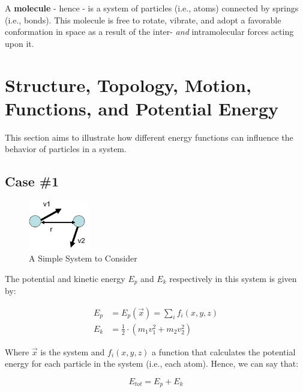 \documentclass[
  letterpaper,
  DIV=11,
  numbers=noendperiod]{scrreprt}
\begin{document}
A \textbf{molecule} - hence - is a system of particles (i.e., atoms)
connected by springs (i.e., bonds). This molecule is free to rotate,
vibrate, and adopt a favorable conformation in space as a result of the
inter- \emph{and} intramolecular forces acting upon it.

\hypertarget{structure-topology-motion-functions-and-potential-energy-1}{%
\section{Structure, Topology, Motion, Functions, and Potential
Energy}\label{structure-topology-motion-functions-and-potential-energy-1}}

This section aims to illustrate how different energy functions can
influence the behavior of particles in a system.

\hypertarget{case-1-1}{%
\subsection{Case \#1}\label{case-1-1}}

\begin{figure}

{\centering \includegraphics[width=1.04in,height=\textheight]{./images/wk1/system.jpg}

}

\caption{A Simple System to Consider}

\end{figure}

The potential and kinetic energy \(E_p\) and \(E_k\) respectively in
this system is given by:

\begin{align}
  E_p &= E_p(\vec{x}) = \sum_{i}f_i(x, y, z) \\ 
  E_k &= \frac{1}{2} \cdot (m_1v_1^2 + m_2v_2^2) 
\end{align}

Where \(\vec{x}\) is the system and \(f_i(x, y, z)\) a function that
calculates the potential energy for each particle in the system (i.e.,
each atom). Hence, we can say that:

\begin{equation}
  E_{tot} = E_p + E_k
\end{equation}
\end{document}
